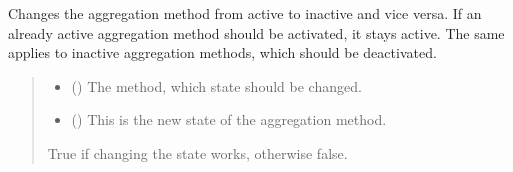 \documentclass[letterpaper,10pt,english]{sphinxmanual}
\begin{document}
\begin{fulllineitems}
\begin{fulllineitems}
\label{\detokenize{apidoc/src.osm_configurator.model.project.configuration:src.osm_configurator.model.project.configuration.aggregation_configuration.AggregationConfiguration.set_aggregation_method_active}}
\pysigstartsignatures
{}
\pysigstopsignatures
\sphinxAtStartPar
Changes the aggregation method from active to inactive and vice versa. If an already active aggregation
method should be activated, it stays active. The same applies to inactive aggregation methods, which should be deactivated.
\begin{quote}\begin{description}
\begin{itemize}
\item {} 
\sphinxAtStartPar
{} ({\hyperref[\detokenize{apidoc/src.osm_configurator.model.project.calculation:src.osm_configurator.model.project.calculation.aggregation_method_enum.AggregationMethod}]{}}) \textendash{} The method, which state should be changed.

\item {} 
\sphinxAtStartPar
{} () \textendash{} This is the new state of the aggregation method.

\end{itemize}

\sphinxAtStartPar
True if changing the state works, otherwise false.

\sphinxAtStartPar
{}

\end{description}\end{quote}

\end{fulllineitems}


\end{fulllineitems}
\end{document}
